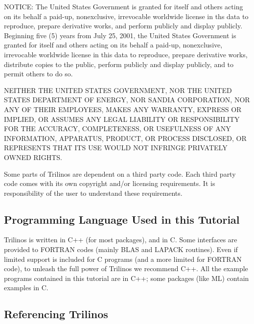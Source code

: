 NOTICE: The United States Government is granted for itself and others
acting on its behalf a paid-up, nonexclusive, irrevocable worldwide
license in ths data to reproduce, prepare derivative works, and perform
publicly and display publicly.  Beginning five (5) years from July 25,
2001, the United States Government is granted for itself and others
acting on its behalf a paid-up, nonexclusive, irrevocable worldwide
license in this data to reproduce, prepare derivative works, distribute
copies to the public, perform publicly and display publicly, and to
permit others to do so.

NEITHER THE UNITED STATES GOVERNMENT, NOR THE UNITED STATES DEPARTMENT
OF ENERGY, NOR SANDIA CORPORATION, NOR ANY OF THEIR EMPLOYEES, MAKES ANY
WARRANTY, EXPRESS OR IMPLIED, OR ASSUMES ANY LEGAL LIABILITY OR
RESPONSIBILITY FOR THE ACCURACY, COMPLETENESS, OR USEFULNESS OF ANY
INFORMATION, APPARATUS, PRODUCT, OR PROCESS DISCLOSED, OR REPRESENTS
THAT ITS USE WOULD NOT INFRINGE PRIVATELY OWNED RIGHTS.

\medskip

Some parts of Trilinos are dependent on a third party code. Each third
party code comes with its own copyright and/or licensing requirements.
It is responsibility of the user to understand these requirements.


\subsection{Programming Language Used in this Tutorial}
\label{sec:language}

Trilinos is written in C++ (for most packages), and in C. Some
interfaces are provided to FORTRAN codes (mainly BLAS and LAPACK
routines). Even if limited support is included for C programs (and a
more limited for FORTRAN code), to unleash the full power of Trilinos we
recommend C++. All the example programs contained in this tutorial are
in C++; some packages (like ML) contain examples in C.


\subsection{Referencing Trilinos}
\label{sec:referencing}

